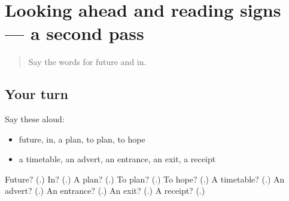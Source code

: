 \section[(dialogue)]{Looking ahead and reading signs — a second pass}

\label{lesson:RU-R139-second-pass-looking-ahead-and-reading-signs}



\begin{quote}
Say the words for future and in.
\end{quote}

\subsection*{Your turn}
Say these aloud:

\begin{itemize}
\raggedright
  \item future, in, a plan, to plan, to hope
  \item a timetable, an advert, an entrance, an exit, a receipt
\end{itemize}

\begin{tcolorbox}[breakable,colback=teal!4,colframe=teal!35!black,title={Before you move on}]
Future? (\textbf{}.) In? (\textbf{}.) A plan? (\textbf{}.) To plan? (\textbf{}.) To hope? (\textbf{}.) A timetable? (\textbf{}.) An advert? (\textbf{}.) An entrance? (\textbf{}.) An exit? (\textbf{}.) A receipt? (\textbf{}.)
\end{tcolorbox}
